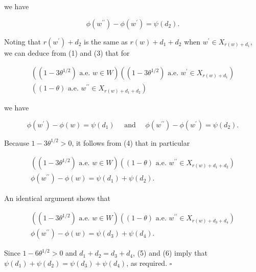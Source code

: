 \documentclass[10pt]{article}
\begin{document}
we have


\begin{equation*}
\phi\left(w^{\prime \prime}\right)-\phi\left(w^{\prime}\right)=\psi\left(d_{2}\right) . \tag{3}
\end{equation*}


Noting that $r\left(w^{\prime}\right)+d_{2}$ is the same as $r(w)+d_{1}+d_{2}$ when $w^{\prime} \in X_{r(w)+d_{1}}$, we can deduce from (1) and (3) that for

$$
\begin{gathered}
\left(\left(1-3 \theta^{1 / 2}\right) \text { a.e. } w \in W\right)\left(\left(1-3 \theta^{1 / 2}\right) \text { a.e. } w^{\prime} \in X_{r(w)+d_{1}}\right) \\
\left((1-\theta) \text { a.e. } w^{\prime \prime} \in X_{r(w)+d_{1}+d_{2}}\right)
\end{gathered}
$$

we have


\begin{equation*}
\phi\left(w^{\prime}\right)-\phi(w)=\psi\left(d_{1}\right) \quad \text { and } \quad \phi\left(w^{\prime \prime}\right)-\phi\left(w^{\prime}\right)=\psi\left(d_{2}\right) . \tag{4}
\end{equation*}


Because $1-3 \theta^{1 / 2}>0$, it follows from (4) that in particular


\begin{gather*}
\left(\left(1-3 \theta^{1 / 2}\right) \text { a.e. } w \in W\right)\left((1-\theta) \text { a.e. } w^{\prime \prime} \in X_{r(w)+d_{1}+d_{2}}\right)  \tag{5}\\
\phi\left(w^{\prime \prime}\right)-\phi(w)=\psi\left(d_{1}\right)+\psi\left(d_{2}\right) .
\end{gather*}


An identical argument shows that


\begin{gather*}
\left(\left(1-3 \theta^{1 / 2}\right) \text { a.e. } w \in W\right)\left((1-\theta) \text { a.e. } w^{\prime \prime} \in X_{r(w)+d_{3}+d_{4}}\right)  \tag{6}\\
\phi\left(w^{\prime \prime}\right)-\phi(w)=\psi\left(d_{3}\right)+\psi\left(d_{4}\right) .
\end{gather*}


Since $1-6 \theta^{1 / 2}>0$ and $d_{1}+d_{2}=d_{3}+d_{4}$, (5) and (6) imply that $\psi\left(d_{1}\right)+\psi\left(d_{2}\right)=\psi\left(d_{3}\right)+\psi\left(d_{4}\right)$, as required. \(\square\)
\end{document}

